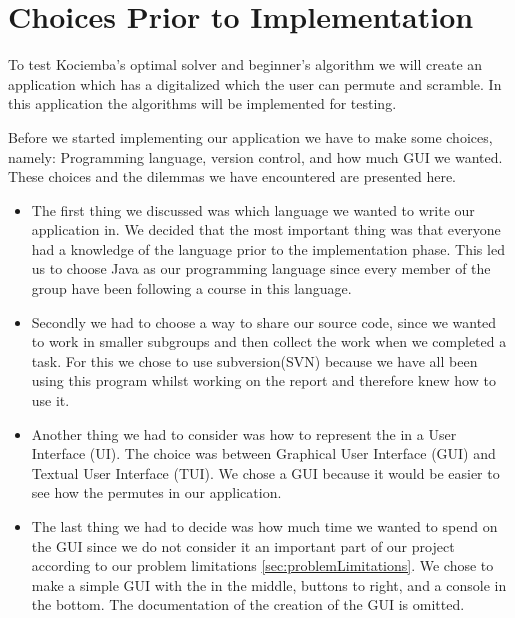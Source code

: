 \chapter{Choices Prior to Implementation}

To test Kociemba's optimal solver and beginner's algorithm we will create an application which has a digitalized \rubik{} which the user can permute and scramble.
In this application the algorithms will be implemented for testing.

Before we started implementing our application we have to make some choices, namely: Programming language, version control, and how much GUI we wanted.
These choices and the dilemmas we have encountered are presented here.

\begin{itemize}
	\item The first thing we discussed was which language we wanted to write our application in.
We decided that the most important thing was that everyone had a knowledge of the language prior to the implementation phase.
This led us to choose Java as our programming language since every member of the group have been following a course in this language.

	\item Secondly we had to choose a way to share our source code, since we wanted to work in smaller subgroups and then collect the work when we completed a task.
For this we chose to use subversion(SVN) because we have all been using this program whilst working on the report and therefore knew how to use it.

	\item Another thing we had to consider was how to represent the \rubik{} in a User Interface (UI). The choice was between Graphical User Interface (GUI) and Textual User Interface (TUI). We chose a GUI because it would be easier to see how the \rubik{} permutes in our application.  
	\item The last thing we had to decide was how much time we wanted to spend on the GUI since we do not consider it an important part of our project according to our problem limitations \ref{sec:problemLimitations}.
We chose to make a simple GUI with the \rubik{} in the middle, buttons to right, and a console in the bottom.
The documentation of the creation of the GUI is omitted.
\end{itemize}
